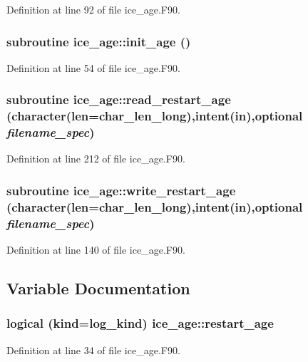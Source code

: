 Definition at line 92 of file ice\_\-age.F90.\hypertarget{namespaceice__age_ab41cc265d5ceb720ed00b72b52f9d0e1}{
\subsubsection[{init\_\-age}]{\setlength{\rightskip}{0pt plus 5cm}subroutine ice\_\-age::init\_\-age ()}}
\label{namespaceice__age_ab41cc265d5ceb720ed00b72b52f9d0e1}


Definition at line 54 of file ice\_\-age.F90.\hypertarget{namespaceice__age_ab078eb2b576a145e5de96f2c9daa06c5}{
\subsubsection[{read\_\-restart\_\-age}]{\setlength{\rightskip}{0pt plus 5cm}subroutine ice\_\-age::read\_\-restart\_\-age (character(len=char\_\-len\_\-long),intent(in),optional {\em filename\_\-spec})}}
\label{namespaceice__age_ab078eb2b576a145e5de96f2c9daa06c5}


Definition at line 212 of file ice\_\-age.F90.\hypertarget{namespaceice__age_a6eb51bd21cc52fcd8d1985badbfca036}{
\subsubsection[{write\_\-restart\_\-age}]{\setlength{\rightskip}{0pt plus 5cm}subroutine ice\_\-age::write\_\-restart\_\-age (character(len=char\_\-len\_\-long),intent(in),optional {\em filename\_\-spec})}}
\label{namespaceice__age_a6eb51bd21cc52fcd8d1985badbfca036}


Definition at line 140 of file ice\_\-age.F90.

\subsection{Variable Documentation}
\hypertarget{namespaceice__age_ad634a6462e5a115ebaa8822c16324ee9}{
\subsubsection[{restart\_\-age}]{\setlength{\rightskip}{0pt plus 5cm}logical (kind=log\_\-kind) {\bf ice\_\-age::restart\_\-age}}}
\label{namespaceice__age_ad634a6462e5a115ebaa8822c16324ee9}


Definition at line 34 of file ice\_\-age.F90.